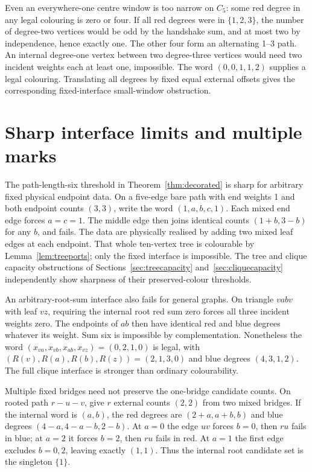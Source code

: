 Even an everywhere-one centre window is too narrow on $C_5$:
some red degree in any legal colouring is zero or four. If all red
degrees were in $\{1,2,3\}$, the number of degree-two vertices
would be odd by the handshake sum, and at most two by independence,
hence exactly one. The other four form an alternating 1--3 path.
An internal degree-one vertex between two degree-three vertices
would need two incident weights each at least one, impossible.
The word $(0,0,1,1,2)$ supplies a legal colouring. Translating all
degrees by fixed equal external offsets gives the corresponding
fixed-interface small-window obstruction.

\section{Sharp interface limits and multiple marks}\label{sec:interfacebarriers}

The path-length-six threshold in Theorem~\ref{thm:decorated} is
sharp for arbitrary fixed physical endpoint data. On a five-edge
bare path with end weights 1 and both endpoint counts $(3,3)$,
write the word $(1,a,b,c,1)$. Each mixed end edge forces $a=c=1$.
The middle edge then joins identical counts $(1+b,3-b)$ for any
$b$, and fails. The data are physically realised by adding two
mixed leaf edges at each endpoint. That whole ten-vertex tree is
colourable by Lemma~\ref{lem:treeports}; only the fixed interface
is impossible. The tree and clique capacity obstructions of
Sections~\ref{sec:treecapacity} and~\ref{sec:cliquecapacity} independently
show sharpness of their preserved-colour thresholds.

An arbitrary-root-sum interface also fails for general graphs. On
triangle $vabv$ with leaf $vz$, requiring the internal root red
sum zero forces all three incident weights zero. The endpoints of
$ab$ then have identical red and blue degrees whatever its weight.
Sum six is impossible by complementation. Nonetheless the word
$(x_{va},x_{vb},x_{ab},x_{vz})=(0,2,1,0)$ is legal, with
$(R(v),R(a),R(b),R(z))=(2,1,3,0)$ and blue degrees $(4,3,1,2)$.
The full clique interface is stronger than ordinary colourability.

Multiple fixed bridges need not preserve the one-bridge candidate
counts. On rooted path $r-u-v$, give $r$ external counts $(2,2)$
from two mixed bridges. If the internal word is $(a,b)$, the red
degrees are $(2+a,a+b,b)$ and blue degrees $(4-a,4-a-b,2-b)$.
At $a=0$ the edge $uv$ forces $b=0$, then $ru$ fails in blue;
at $a=2$ it forces $b=2$, then $ru$ fails in red. At $a=1$
the first edge excludes $b=0,2$, leaving exactly $(1,1)$.
Thus the internal root candidate set is the singleton $\{1\}$.

